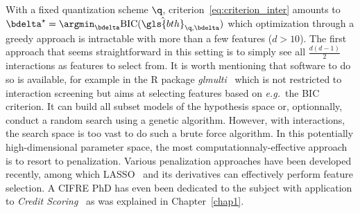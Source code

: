 With a fixed quantization scheme $\q$, criterion~\ref{eq:criterion_inter} amounts to $\bdelta^\star = \argmin_{\bdelta} \text{BIC}(\hat{\gls{bth}}_{\q,\bdelta})$ which optimization through a greedy approach is intractable with more than a few features ($d > 10$). The first approach that seems straightforward in this setting is to simply see all $\frac{d(d-1)}{2}$ interactions as features to select from. It is worth mentioning that software to do so is available, for example in the \textsf{R} package \textit{glmulti}~\cite{calcagno2010glmulti} which is not restricted to interaction screening but aims at selecting features based on \textit{e.g.}\ the BIC criterion. It can build all subset models of the hypothesis space or, optionnally, conduct a random search using a genetic algorithm. However, with interactions, the search space is too vast to do such a brute force algorithm. In this potentially high-dimensional parameter space, the most computationnaly-effective approach is to resort to penalization. Various penalization approaches have been developed recently, among which LASSO~\cite{tibshirani1996regression} and its derivatives can effectively perform feature selection. A CIFRE PhD has even been dedicated to the subject with application to \textit{Credit Scoring}~\cite{vital2016} as was explained in Chapter~\ref{chap1}.

